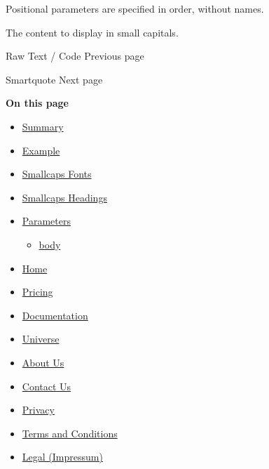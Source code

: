 \label{parameters-body-positional-tooltip}
Positional parameters are specified in order, without names.

The content to display in small capitals.

\href{/docs/reference/text/raw/}{\pandocbounded{}}

{ Raw Text / Code } { Previous page }

\href{/docs/reference/text/smartquote/}{\pandocbounded{}}

{ Smartquote } { Next page }

\textbf{On this page}

\begin{itemize}
\tightlist
\item
  \hyperref[summary]{Summary}
\item
  \hyperref[example]{Example}
\item
  \hyperref[smallcaps-fonts]{Smallcaps Fonts}
\item
  \hyperref[smallcaps-headings]{Smallcaps Headings}
\item
  \hyperref[parameters]{Parameters}

  \begin{itemize}
  \tightlist
  \item
    \hyperref[parameters-body]{body}
  \end{itemize}
\end{itemize}

\begin{itemize}
\tightlist
\item
  \href{/}{Home}
\item
  \href{/pricing/}{Pricing}
\item
  \href{/docs/}{Documentation}
\item
  \href{/universe/}{Universe}
\item
  \href{/about/}{About Us}
\item
  \href{/contact/}{Contact Us}
\item
  \href{/privacy/}{Privacy}
\item
  \href{https://typst.app/terms}{Terms and Conditions}
\item
  \href{/legal/}{Legal (Impressum)}
\end{itemize}


